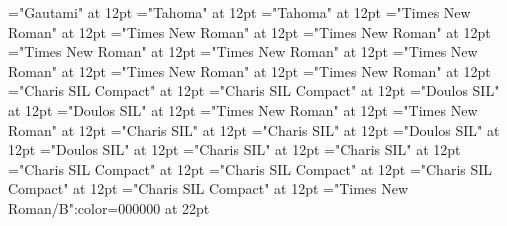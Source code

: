 \documentclass[a4paper]{article}
\begin{document}
\font\divggoTeluIN="Gautami" at 12pt
\font\spanggofonipaxemic="Tahoma" at 12pt
\font\divggofonipaxemic="Tahoma" at 12pt
\font\spanfr="Times New Roman" at 12pt
\font\divfr="Times New Roman" at 12pt
\font\spanfa="Times New Roman" at 12pt
\font\divfa="Times New Roman" at 12pt
\font\spanes="Times New Roman" at 12pt
\font\dives="Times New Roman" at 12pt
\font\spanen="Times New Roman" at 12pt
\font\diven="Times New Roman" at 12pt
\font\spanenQaaaxtest="Charis SIL Compact" at 12pt
\font\divenQaaaxtest="Charis SIL Compact" at 12pt
\font\spanenfonipa="Doulos SIL" at 12pt
\font\divenfonipa="Doulos SIL" at 12pt
\font\spande="Times New Roman" at 12pt
\font\divde="Times New Roman" at 12pt
\font\spanbzh="Charis SIL" at 12pt
\font\divbzh="Charis SIL" at 12pt
\font\spanbzhfonipa="Doulos SIL" at 12pt
\font\divbzhfonipa="Doulos SIL" at 12pt
\font\spanbss="Charis SIL" at 12pt
\font\divbss="Charis SIL" at 12pt
\font\spanbssxako="Charis SIL Compact" at 12pt
\font\divbssxako="Charis SIL Compact" at 12pt
\font\spanbssfonipa="Charis SIL Compact" at 12pt
\font\divbssfonipa="Charis SIL Compact" at 12pt
\color{black} 
\thispagestyle{empty} 
\font\CoverPageHeading="Times New Roman/B":color=000000 at 22pt 
\vskip 60pt 
\begin{center} 
\end{center} 
\newpage 
\newpage 
\thispagestyle{empty} 
\mbox{} 
\end{document}

